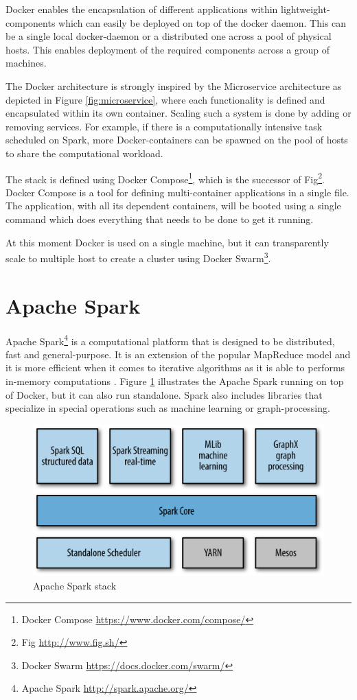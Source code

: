 Docker enables the encapsulation of different applications within lightweight-components which can easily be deployed on top of the docker daemon. This can be a single local docker-daemon or a distributed one across a pool of physical hosts. This enables deployment of the required components across a group of machines.

The Docker architecture is strongly inspired by the Microservice architecture as depicted in Figure \ref{fig:microservice}, where each functionality is defined and encapsulated within its own container. Scaling such a system is done by adding or removing services. For example, if there is a computationally intensive task scheduled on Spark, more Docker-containers can be spawned on the pool of hosts to share the computational workload.

The stack is defined using Docker Compose\footnote{Docker Compose \url{https://www.docker.com/compose/}}, which is the successor of Fig\footnote{Fig \url{http://www.fig.sh/}}. Docker Compose is a tool for defining multi-container applications in a single file. The application, with all its dependent containers, will be booted using a single command which does everything that needs to be done to get it running.

At this moment Docker is used on a single machine, but it can transparently scale to multiple host to create a cluster using Docker Swarm\footnote{Docker Swarm \url{https://docs.docker.com/swarm/}}. 


\section{Apache Spark \label{subsec_spark}}

Apache Spark\footnote{Apache Spark \url{http://spark.apache.org/}} is a computational platform that is designed to be distributed, fast and general-purpose. It is an extension of the popular MapReduce model \cite{Dean:2008:MSD:1327452.1327492} and it is more efficient when it comes to iterative algorithms as it is able to performs in-memory computations \cite{Xin:2013:SSR:2463676.2465288}. Figure \ref{fig:sparkstack} illustrates the Apache Spark running on top of Docker, but it can also run standalone. Spark also includes libraries that specialize in special operations such as machine learning or graph-processing.

\begin{figure}[ht!]
\centering
\includegraphics[width=.9\textwidth]{figures/sparkstack.png}
\caption{Apache Spark stack \label{fig:sparkstack}}
\end{figure}

